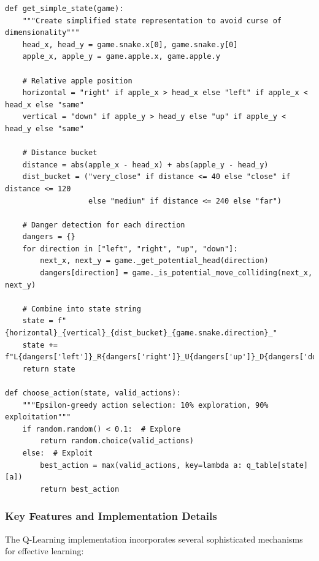 \documentclass[11pt,a4paper]{article}
\begin{document}
\begin{lstlisting}[caption=Q-Learning Agent]
def get_simple_state(game):
    """Create simplified state representation to avoid curse of dimensionality"""
    head_x, head_y = game.snake.x[0], game.snake.y[0]
    apple_x, apple_y = game.apple.x, game.apple.y
    
    # Relative apple position
    horizontal = "right" if apple_x > head_x else "left" if apple_x < head_x else "same"
    vertical = "down" if apple_y > head_y else "up" if apple_y < head_y else "same"
    
    # Distance bucket
    distance = abs(apple_x - head_x) + abs(apple_y - head_y)
    dist_bucket = ("very_close" if distance <= 40 else "close" if distance <= 120 
                   else "medium" if distance <= 240 else "far")
    
    # Danger detection for each direction
    dangers = {}
    for direction in ["left", "right", "up", "down"]:
        next_x, next_y = game._get_potential_head(direction)
        dangers[direction] = game._is_potential_move_colliding(next_x, next_y)
    
    # Combine into state string
    state = f"{horizontal}_{vertical}_{dist_bucket}_{game.snake.direction}_"
    state += f"L{dangers['left']}_R{dangers['right']}_U{dangers['up']}_D{dangers['down']}"
    return state

def choose_action(state, valid_actions):
    """Epsilon-greedy action selection: 10% exploration, 90% exploitation"""
    if random.random() < 0.1:  # Explore
        return random.choice(valid_actions)
    else:  # Exploit
        best_action = max(valid_actions, key=lambda a: q_table[state][a])
        return best_action
\end{lstlisting}

\subsubsection{Key Features and Implementation Details}
The Q-Learning implementation incorporates several sophisticated mechanisms for effective learning:
\end{document}
